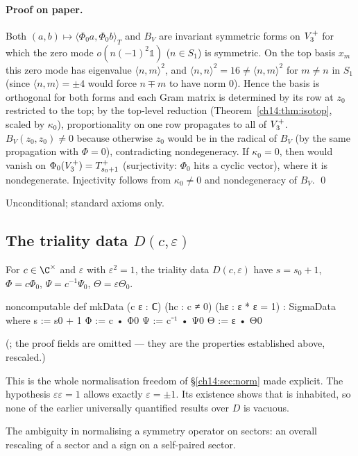 \paragraph{Proof on paper.}  Both $(a,b)\mapsto\langle\Phi_0a,\Phi_0b\rangle_T$ and $B_V$ are invariant
symmetric forms on $V_3^{+}$ for which the zero mode $o(n(-1)^2\mathbb 1)$ ($n\in S_1$) is symmetric.  On the
top basis $x_m$ this zero mode has eigenvalue $\langle n,m\rangle^2$, and $\langle n,n\rangle^2=16\ne\langle n,m\rangle^2$
for $m\ne n$ in $S_1$ (since $\langle n,m\rangle=\pm4$ would force $n\mp m$ to have norm $0$).  Hence the basis is
orthogonal for both forms and each Gram matrix is determined by its row at $z_0$ restricted to the
top; by the top-level reduction (Theorem~\ref{ch14:thm:isotop}, scaled by $\kappa_0$), proportionality on
one row propagates to all of $V_3^{+}$.  $B_V(z_0,z_0)\ne0$ because otherwise $z_0$ would be in the radical
of $B_V$ (by the same propagation with $\Phi=0$), contradicting nondegeneracy.  If $\kappa_0=0$, then
 would vanish on $\Phi_0(V_3^{+})=T_{s_0+1}^+$ (surjectivity: $\Phi_0$ hits a cyclic vector), where it
is nondegenerate.  Injectivity follows from $\kappa_0\ne0$ and nondegeneracy of $B_V$. \qed

\begin{status}Unconditional; standard axioms only.\end{status}

\subsection{\texorpdfstring{The triality data $D(c,\varepsilon)$}{The triality data D(c,epsilon)}}

\begin{definition}[$D(c,\varepsilon)$]\label{ch14:def:mkData}
For $c\in\C^\times$ and $\varepsilon$ with $\varepsilon^2=1$, the triality data
$D(c,\varepsilon)$ have $s=s_0+1$, $\Phi=c\Phi_0$, $\Psi=c^{-1}\Psi_0$, $\Theta=\varepsilon\Theta_0$.
\end{definition}
\begin{leancode}
noncomputable def mkData (c ε : ℂ) (hc : c ≠ 0) (hε : ε * ε = 1) : SigmaData where
  s := s0 + 1
  Φ := c • Φ0
  Ψ := c⁻¹ • Ψ0
  Θ := ε • Θ0
\end{leancode}
(; the proof fields are omitted — they are the properties
established above, rescaled.)

\begin{dictionary}
This is the whole normalisation freedom of \S\ref{ch14:sec:norm} made explicit.  The hypothesis
$\varepsilon\varepsilon=1$ allows exactly $\varepsilon=\pm1$.  Its existence shows that 
is inhabited, so none of the earlier universally quantified results over $D$ is vacuous.
\end{dictionary}
\begin{physics}
The ambiguity in normalising a symmetry operator on sectors: an overall rescaling of a sector and a sign on a self-paired sector.
\end{physics}


